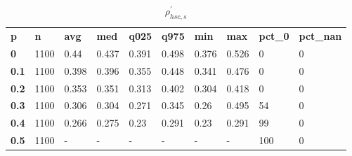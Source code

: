 \begin{table}[h]
 \centering 
\footnotesize
\caption{$\rho_{hsc,s}^\prime $}
\label{tab:alphahscs}
\begin{tabular}[h]{| l l l l l l l l l l|
    } \hline
\textbf{ p} & \textbf{ n} & \textbf{ avg} & \textbf{ med} & \textbf{ q025} & \textbf{ q975} & \textbf{ min} & \textbf{ max} & \textbf{ pct\_0} & \textbf{ pct\_nan}
           \\
  \textbf{  0} & 1100 &  0.44 & 0.437 & 0.391 & 0.498 & 0.376 & 0.526 &   0 & 0
           \\
  \textbf{0.1} & 1100 & 0.398 & 0.396 & 0.355 & 0.448 & 0.341 & 0.476 &   0 & 0
           \\
  \textbf{0.2} & 1100 & 0.353 & 0.351 & 0.313 & 0.402 & 0.304 & 0.418 &   0 & 0
           \\
  \textbf{0.3} & 1100 & 0.306 & 0.304 & 0.271 & 0.345 &  0.26 & 0.495 &  54 & 0
           \\
  \textbf{0.4} & 1100 & 0.266 & 0.275 &  0.23 & 0.291 &  0.23 & 0.291 &  99 & 0
           \\
  \textbf{0.5} & 1100 & - & - & - & - & - & - & 100 & 0
           \\
 \hline \end{tabular}
 \end{table}
